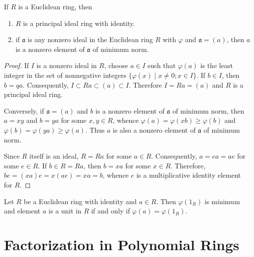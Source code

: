 \begin{theorem}
    If $R$ is a Euclidean ring, then
    \begin{enumerate}
        \item
              $R$ is a principal ideal ring with identity.
        \item
              if $\mathfrak{a}$ is any nonzero ideal in the Euclidean ring $R$ with $\varphi$ and $\mathfrak{a}=(a)$, then $a$ is a nonzero element of $\mathfrak{a}$ of minimum norm.
    \end{enumerate}
    \begin{proof}
        If $I$ is a nonzero ideal in $R$, choose $a \in I$ such that $\varphi(a)$ is the least integer in the set of nonnegative integers $\{\varphi(x) \mid x \neq 0 ; x \in I\}$. If $b \in I$, then $b=q a$.
        Consequently, $I \subset R a \subset(a) \subset I$. Therefore $I=R a=(a)$ and $R$ is a principal ideal ring.

        Conversely, if $\mathfrak{a}=\left(a\right)$ and $b$ is a
        nonzero element of $\mathfrak{a}$ of minimum norm, then $a=xy$ and $b=ya$ for some $x,y\in R$, whence $\varphi\left(a\right)=\varphi\left(xb\right)\geq \varphi(b)$ and $\varphi\left(b\right)=\varphi\left(ya\right)\geq \varphi(a)$. Thus $a$ is also a nonzero element of $\mathfrak{a}$ of minimum norm.

        Since $R$ itself is an ideal, $R=R a$ for some $a \in R$. Consequently, $a=e a=a e$ for some $e \in R$. If $b \in R=R a$, then $b=x a$ for some $x \in R$. Therefore, $b e=(x a) e =x(a e)=x a=b$, whence $e$ is a multiplicative identity element for $R$.
    \end{proof}
\end{theorem}

\begin{corollary}
    Let $R$ be a Euclidean ring with identity and $a \in R$.
    Then $\varphi(1_R)$ is minimum and element $a$ is a unit in $R$ if and only if $\varphi(a)=\varphi\left(1_R\right)$.
\end{corollary}









\section{Factorization in Polynomial Rings} %

